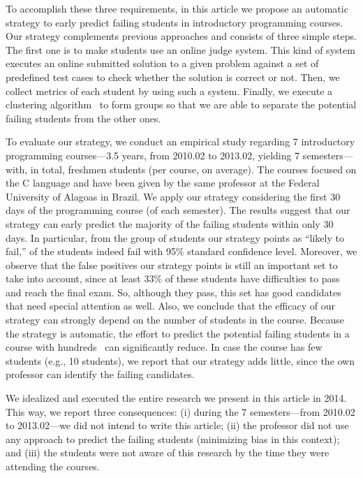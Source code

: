 To accomplish these three requirements, in this article we propose an automatic strategy to early predict failing students in introductory programming courses. Our strategy complements previous approaches and consists of three simple steps. The first one is to make students use an online judge system. This kind of system executes an online submitted solution to a given problem against a set of predefined test cases to check whether the solution is correct or not. Then, we collect metrics of each student by using such a system. Finally, we execute a clustering algorithm~\cite{hartigan-clustering-algorithms-1975} to form groups so that we are able to separate the potential failing students from the other ones.

To evaluate our strategy, we conduct an empirical study regarding 7 introductory programming courses---3.5 years, from 2010.02 to 2013.02, yielding 7 semesters---with, in total, \totalStudents freshmen students (\studentsCoursesAverage per course, on average). The courses focused on the C language and have been given by the same professor at the Federal University of Alagoas in Brazil. We apply our strategy considering the first 30 days of the programming course (\semesterPercentage of each semester). The results suggest that our strategy can early predict the majority of the failing students within only 30 days. In particular, from the group of students our strategy points as ``likely to fail,'' \higherPrecision of the students indeed fail with 95\% standard confidence level. Moreover, we observe that the false positives our strategy points is still an important set to take into account, since at least 33\% of these students have difficulties to pass and reach the final exam. So, although they pass, this set has good candidates that need special attention as well. Also, we conclude that the efficacy of our strategy can strongly depend on the number of students in the course. Because the strategy is automatic, the effort to predict the potential failing students in a course with hundreds~\cite{bennedsen-sigcse-failure-rates-2007} can significantly reduce. In case the course has few students (e.g., 10 students), we report that our strategy adds little, since the own professor can identify the failing candidates.

We idealized and executed the entire research we present in this article in 2014. This way, we report three consequences: (i) during the 7 semesters---from 2010.02 to 2013.02---we did not intend to write this article; (ii) the professor did not use any approach to predict the failing students (minimizing bias in this context); and (iii) the students were not aware of this research by the time they were attending the courses.

